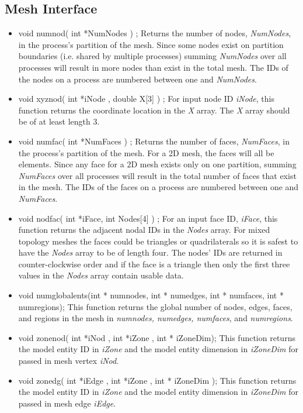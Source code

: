 \subsection{Mesh Interface}
\begin{itemize}
\item void numnod( int *NumNodes ) ; Returns the number of nodes, \textit{NumNodes}, in the process's partition of the mesh.  Since
 some nodes  exist on partition boundaries (i.e. shared by multiple processes) summing \textit{NumNodes} over all
processes will result in more nodes than exist in the total mesh. The IDs of the nodes on a process are numbered between
one and \textit{NumNodes}.
\item void xyznod( int *iNode , double X[3] ) ; For input node ID \textit{iNode}, this function returns the coordinate location in 
the \textit{X} array.  The \textit{X} array should be of at least length 3.
\item void numfac( int *NumFaces ) ; Returns the number of faces, \textit{NumFaces}, in the process's partition of the mesh. 
For a 2D mesh, the faces will all be elements. Since
 any face for a 2D mesh  exists only on  one partition,  summing \textit{NumFaces} over all
processes will result in the total number of faces that exist in the mesh. The IDs of the faces on a process are numbered between
one and \textit{NumFaces}.
\item void nodfac( int *iFace, int Nodes[4] ) ; For an input face ID, \textit{iFace}, this function returns the adjacent nodal IDs
in the \textit{Nodes} array.  
For mixed topology meshes the faces could be triangles or quadrilaterals so it is safest to have the \textit{Nodes} array to be of
length four.  The nodes' IDs are returned in counter-clockwise order and if the face is a triangle then only the first three
values in the \textit{Nodes} array contain usable data.
\item void numglobalents(int * numnodes, int * numedges, int * numfaces, int * numregions); This function returns
the global number of nodes, edges, faces, and regions in the mesh in \textit{numnodes, numedges, numfaces}, and \textit{numregions}.
\item  void zonenod( int *iNod , int *iZone , int * iZoneDim); This function returns the model entity ID in 
\textit{iZone} and the model entity dimension in \textit{iZoneDim} for passed in mesh vertex \textit{iNod}.
\item void zonedg( int *iEdge , int *iZone , int * iZoneDim ); This function returns the model entity ID in 
\textit{iZone} and the model entity dimension in \textit{iZoneDim} for passed in mesh edge \textit{iEdge}.


\end{itemize}
